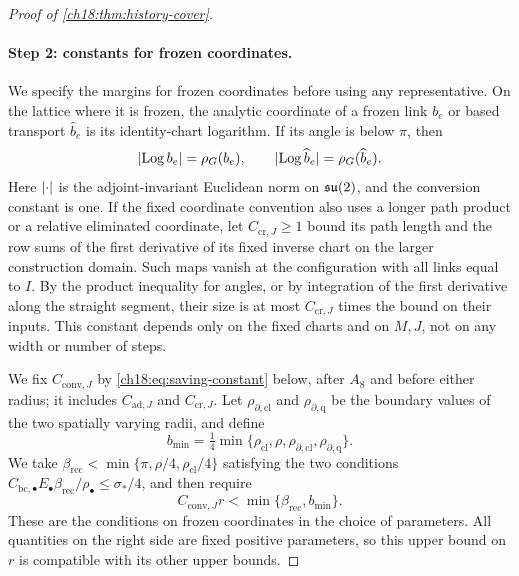 \begin{proof}[Proof of \cref{ch18:thm:history-cover}]
\paragraph{Step 2: constants for frozen coordinates.}
We specify the margins for frozen coordinates before using any representative. On the lattice where it is frozen, the analytic coordinate of a frozen link $b_e$ or based transport $\widehat b_e$ is its identity-chart logarithm. If its angle is below $\pi$, then
\begin{equation}\label{ch18:eq:native-saving-coordinate}
 \lvert \operatorname{Log} b_e\rvert=\rho_G(b_e),\qquad
 \lvert \operatorname{Log}\widehat b_e\rvert=\rho_G(\widehat b_e).
\end{equation}
Here $\lvert \cdot\rvert$ is the adjoint-invariant Euclidean norm on $\mathfrak{su}(2)$, and the conversion constant is one. If the fixed coordinate convention also uses a longer path product or a relative eliminated coordinate, let $C_{\mathrm{cr},J}\ge1$ bound its path length and the row sums of the first derivative of its fixed inverse chart on the larger construction domain. Such maps vanish at the configuration with all links equal to $I$. By the product inequality for angles, or by integration of the first derivative along the straight segment, their size is at most $C_{\mathrm{cr},J}$ times the bound on their inputs. This constant depends only on the fixed charts and on $M,J$, not on any width or number of steps.

We fix $C_{\mathrm{conv},J}$ by \eqref{ch18:eq:saving-constant} below, after $A_8$ and before either radius; it includes $C_{\mathrm{ad},J}$ and $C_{\mathrm{cr},J}$. Let $\rho_{\partial,\mathrm{cl}}$ and $\rho_{\partial,\mathrm q}$ be the boundary values of the two spatially varying radii, and define
\[
 b_{\min}=\tfrac14\min\{\rho_{\mathrm{cl}},\rho,
                  \rho_{\partial,\mathrm{cl}},\rho_{\partial,\mathrm q}\}.
\]
We take $\beta_{\mathrm{rec}}<\min\{\pi,\rho/4,\rho_{\mathrm{cl}}/4\}$ satisfying the two conditions $C_{\mathrm{bc},\bullet}E_\bullet\beta_{\mathrm{rec}}/\rho_\bullet\le\sigma_*/4$, and then require
\begin{equation}\label{ch18:eq:actual-saving-gate}
 C_{\mathrm{conv},J}r<\min\{\beta_{\mathrm{rec}},b_{\min}\}.
\end{equation}
These are the conditions on frozen coordinates in the choice of parameters. All quantities on the right side are fixed positive parameters, so this upper bound on $r$ is compatible with its other upper bounds.


\end{proof}
